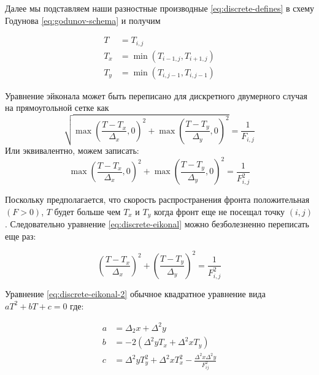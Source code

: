 


Далее мы подставляем наши разностные производные
\eqref{eq:discrete-defines} в схему Годунова \eqref{eq:godunov-schema}
и получим

\begin{equation}
  \begin{aligned}
  \label{eq:replaced}
    T &= T_{i,j}\\
    T_{x}&= \min(T_{i-1,j},T_{i+1,j})\\
    T_{y}&= \min(T_{i,j-1},T_{i,j-1})
      \end{aligned}
\end{equation}

Уравнение эйконала может быть переписано для дискретного двумерного
случая на прямоугольной сетке как
\begin{equation*}
  \sqrt{\max \left( \frac {T-T_{x}}{\Delta_x},0 \right)^2+  \max \left( \frac
  {T-T_{y}}{\Delta_y},0\right)^2} = \frac{1}{F_{i,j}}
\end{equation*}
Или эквивалентно, можем записать:
\begin{equation}
  \label{eq:discrete-eikonal}
  \max \left( \frac {T-T_{x}}{\Delta_x},0 \right)^2+  \max \left( \frac
      {T-T_{y}}{\Delta_y},0\right)^2 = \frac{1}{F_{i,j}^2}
\end{equation}

Поскольку предполагается, что скорость распространения фронта
положительная $(F>0)$, $T$ будет больше чем $T_x$ и $T_y$ когда фронт
еще не посещал точку $(i,j)$. Следовательно уравнение
\eqref{eq:discrete-eikonal} можно безболезненно переписать еще раз:

\begin{equation}
  \label{eq:discrete-eikonal-2}
  \left( \frac {T-T_{x}}{\Delta_x} \right)^2+
  \left( \frac {T-T_{y}}{\Delta_y} \right)^2 = \frac{1}{F_{i,j}^2}
\end{equation}

Уравнение \eqref{eq:discrete-eikonal-2} обычное квадратное уравнение
вида $aT^2+bT+c=0$ где:

\begin{equation}
  \begin{aligned}
  \label{eq:replaced}
    a &= \Delta_2 x + \Delta^2 y\\[0.4cm]
    b &= -2(\Delta^2y T_{x}+\Delta^2x T_{y})\\
    c &= \Delta^2 y T_{y}^2 + \Delta^2 x T_{x}^2 - \frac{\Delta^2 x
      \Delta^2 y}{F_{ij}^2}
    \end{aligned}
\end{equation}


